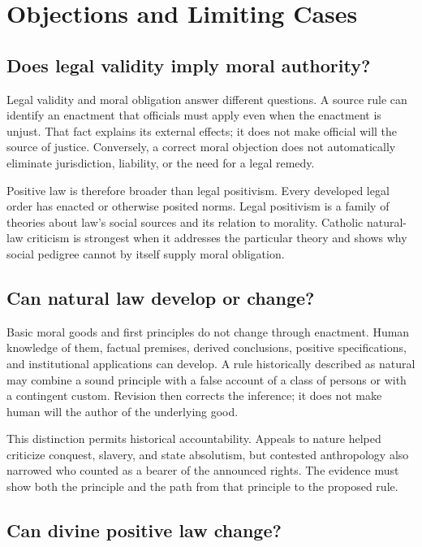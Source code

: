 \section{Objections and Limiting Cases}

\subsection{Does legal validity imply moral authority?}

Legal validity and moral obligation answer different questions. A source rule can identify an enactment that officials must apply even when the enactment is unjust. That fact explains its external effects; it does not make official will the source of justice. Conversely, a correct moral objection does not automatically eliminate jurisdiction, liability, or the need for a legal remedy.

Positive law is therefore broader than legal positivism. Every developed legal order has enacted or otherwise posited norms. Legal positivism is a family of theories about law's social sources and its relation to morality. Catholic natural-law criticism is strongest when it addresses the particular theory and shows why social pedigree cannot by itself supply moral obligation.

\subsection{Can natural law develop or change?}

Basic moral goods and first principles do not change through enactment. Human knowledge of them, factual premises, derived conclusions, positive specifications, and institutional applications can develop. A rule historically described as natural may combine a sound principle with a false account of a class of persons or with a contingent custom. Revision then corrects the inference; it does not make human will the author of the underlying good.

This distinction permits historical accountability. Appeals to nature helped criticize conquest, slavery, and state absolutism, but contested anthropology also narrowed who counted as a bearer of the announced rights. The evidence must show both the principle and the path from that principle to the proposed rule.

\subsection{Can divine positive law change?}

